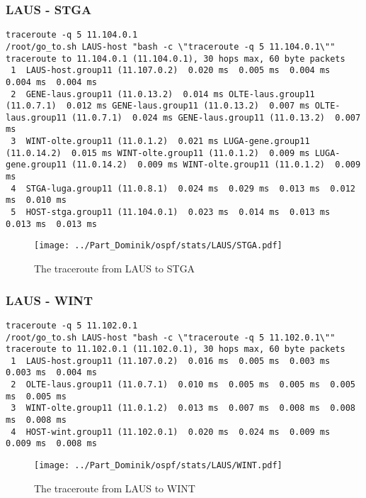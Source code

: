 \subsubsection{LAUS - STGA}
\begin{lstlisting}
traceroute -q 5 11.104.0.1
/root/go_to.sh LAUS-host "bash -c \"traceroute -q 5 11.104.0.1\""
traceroute to 11.104.0.1 (11.104.0.1), 30 hops max, 60 byte packets
 1  LAUS-host.group11 (11.107.0.2)  0.020 ms  0.005 ms  0.004 ms  0.004 ms  0.004 ms
 2  GENE-laus.group11 (11.0.13.2)  0.014 ms OLTE-laus.group11 (11.0.7.1)  0.012 ms GENE-laus.group11 (11.0.13.2)  0.007 ms OLTE-laus.group11 (11.0.7.1)  0.024 ms GENE-laus.group11 (11.0.13.2)  0.007 ms
 3  WINT-olte.group11 (11.0.1.2)  0.021 ms LUGA-gene.group11 (11.0.14.2)  0.015 ms WINT-olte.group11 (11.0.1.2)  0.009 ms LUGA-gene.group11 (11.0.14.2)  0.009 ms WINT-olte.group11 (11.0.1.2)  0.009 ms
 4  STGA-luga.group11 (11.0.8.1)  0.024 ms  0.029 ms  0.013 ms  0.012 ms  0.010 ms
 5  HOST-stga.group11 (11.104.0.1)  0.023 ms  0.014 ms  0.013 ms  0.013 ms  0.013 ms
\end{lstlisting}
\begin{figure}[H]
\centering
\texttt{[image: ../Part\_Dominik/ospf/stats/LAUS/STGA.pdf]}
\caption{The traceroute from LAUS to STGA}
\end{figure}
\clearpage
\subsubsection{LAUS - WINT}
\begin{lstlisting}
traceroute -q 5 11.102.0.1
/root/go_to.sh LAUS-host "bash -c \"traceroute -q 5 11.102.0.1\""
traceroute to 11.102.0.1 (11.102.0.1), 30 hops max, 60 byte packets
 1  LAUS-host.group11 (11.107.0.2)  0.016 ms  0.005 ms  0.003 ms  0.003 ms  0.004 ms
 2  OLTE-laus.group11 (11.0.7.1)  0.010 ms  0.005 ms  0.005 ms  0.005 ms  0.005 ms
 3  WINT-olte.group11 (11.0.1.2)  0.013 ms  0.007 ms  0.008 ms  0.008 ms  0.008 ms
 4  HOST-wint.group11 (11.102.0.1)  0.020 ms  0.024 ms  0.009 ms  0.009 ms  0.008 ms
\end{lstlisting}
\begin{figure}[H]
\centering
\texttt{[image: ../Part\_Dominik/ospf/stats/LAUS/WINT.pdf]}
\caption{The traceroute from LAUS to WINT}
\end{figure}
\clearpage
